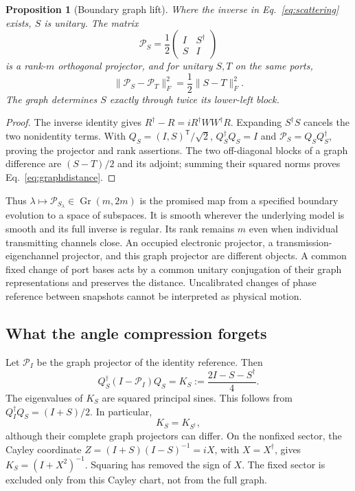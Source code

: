 \documentclass[11pt]{article}
\newtheorem{proposition}{Proposition}
\newcommand{\Gr}{\operatorname{Gr}}
\begin{document}
\begin{proposition}[Boundary graph lift]
Where the inverse in Eq.~\eqref{eq:scattering} exists, $S$ is unitary. The matrix
\begin{equation}
\mathcal P_S=\frac12\begin{pmatrix}I&S^\dagger\\S&I\end{pmatrix}
\label{eq:graph}
\end{equation}
is a rank-$m$ orthogonal projector, and for unitary $S,T$ on the same ports,
\begin{equation}
\|\mathcal P_S-\mathcal P_T\|_F^2=\frac12\|S-T\|_F^2.
\label{eq:graphdistance}
\end{equation}
The graph determines $S$ exactly through twice its lower-left block.
\end{proposition}
\begin{proof}
The inverse identity gives $R^\dagger-R=iR^\dagger WW^\dagger R$. Expanding $S^\dagger S$ cancels the two nonidentity terms. With $Q_S=(I,S)^\mathsf T/\sqrt2$, $Q_S^\dagger Q_S=I$ and $\mathcal P_S=Q_SQ_S^\dagger$, proving the projector and rank assertions. The two off-diagonal blocks of a graph difference are $(S-T)/2$ and its adjoint; summing their squared norms proves Eq.~\eqref{eq:graphdistance}.\end{proof}

Thus $\lambda\mapsto\mathcal P_{S_\lambda}\in\Gr(m,2m)$ is the promised map from a specified boundary evolution to a space of subspaces. It is smooth wherever the underlying model is smooth and its full inverse is regular. Its rank remains $m$ even when individual transmitting channels close. An occupied electronic projector, a transmission-eigenchannel projector, and this graph projector are different objects. A common fixed change of port bases acts by a common unitary conjugation of their graph representations and preserves the distance. Uncalibrated changes of phase reference between snapshots cannot be interpreted as physical motion.

\subsection{What the angle compression forgets}
Let $\mathcal P_I$ be the graph projector of the identity reference. Then
\begin{equation}
Q_S^\dagger(I-\mathcal P_I)Q_S
=K_S:=\frac{2I-S-S^\dagger}{4}.
\label{eq:compression}
\end{equation}
The eigenvalues of $K_S$ are squared principal sines. This follows from
$Q_I^\dagger Q_S=(I+S)/2$. In particular,
\begin{equation}
 K_S=K_{S^\dagger},
\end{equation}
although their complete graph projectors can differ. On the nonfixed sector, the Cayley coordinate $Z=(I+S)(I-S)^{-1}=iX$, with $X=X^\dagger$, gives $K_S=(I+X^2)^{-1}$. Squaring has removed the sign of $X$. The fixed sector is excluded only from this Cayley chart, not from the full graph.
\end{document}
